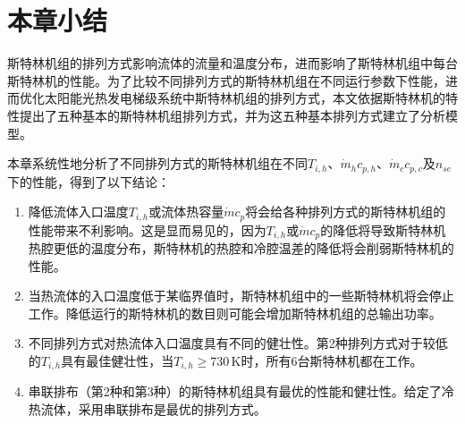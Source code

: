 \section{本章小结}

斯特林机组的排列方式影响流体的流量和温度分布，进而影响了斯特林机组中每台斯特林机的性能。为了比较不同排列方式的斯特林机组在不同运行参数下性能，进而优化太阳能光热发电梯级系统中斯特林机组的排列方式，本文依据斯特林机的特性提出了五种基本的斯特林机组排列方式，并为这五种基本排列方式建立了分析模型。

本章系统性地分析了不同排列方式的斯特林机组在不同$T_{i,h}$、$\dot{m}_hc_{p,h}$、$\dot{m}_cc_{p,c}$及$n_{se}$下的性能，得到了以下结论：

\begin{enumerate}[label=(\arabic*)]
	\item 降低流体入口温度$T_{i,h}$或流体热容量$\dot{m}c_{p}$将会给各种排列方式的斯特林机组的性能带来不利影响。这是显而易见的，因为$T_{i,h}$或$\dot{m}c_p$的降低将导致斯特林机热腔更低的温度分布，斯特林机的热腔和冷腔温差的降低将会削弱斯特林机的性能。
	\item 当热流体的入口温度低于某临界值时，斯特林机组中的一些斯特林机将会停止工作。降低运行的斯特林机的数目则可能会增加斯特林机组的总输出功率。
	\item 不同排列方式对热流体入口温度具有不同的健壮性。第2种排列方式对于较低的$T_{i,h}$具有最佳健壮性，当$T_{i,h} \geqslant 730\,\mathrm{K}$时，所有6台斯特林机都在工作。
	\item 串联排布（第2种和第3种）的斯特林机组具有最优的性能和健壮性。给定了冷热流体，采用串联排布是最优的排列方式。
\end{enumerate}